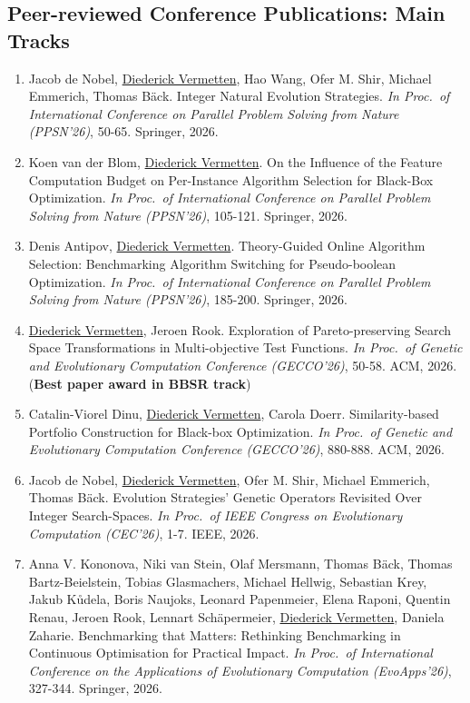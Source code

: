 \subsection*{Peer-reviewed Conference Publications: Main Tracks}
\begin{enumerate}

    \item Jacob de Nobel, \underline{Diederick Vermetten}, Hao Wang, Ofer M. Shir, Michael Emmerich, Thomas B\"ack. Integer Natural Evolution Strategies.
    \emph{In Proc.~of International Conference on Parallel Problem Solving from Nature (PPSN'26)}, 50-65. Springer, 2026.

    \item Koen van der Blom, \underline{Diederick Vermetten}. On the Influence of the Feature Computation Budget on Per-Instance Algorithm Selection for Black-Box Optimization.
    \emph{In Proc.~of International Conference on Parallel Problem Solving from Nature (PPSN'26)}, 105-121. Springer, 2026.

    \item Denis Antipov, \underline{Diederick Vermetten}. Theory-Guided Online Algorithm Selection: Benchmarking Algorithm Switching for Pseudo-boolean Optimization.
    \emph{In Proc.~of International Conference on Parallel Problem Solving from Nature (PPSN'26)}, 185-200. Springer, 2026.

    \item \underline{Diederick Vermetten}, Jeroen Rook. Exploration of Pareto-preserving Search Space Transformations in Multi-objective Test Functions.
    \emph{In Proc.~of Genetic and Evolutionary Computation Conference (GECCO'26)}, 50-58. ACM, 2026. (\textbf{Best paper award in BBSR track})

    \item Catalin-Viorel Dinu, \underline{Diederick Vermetten}, Carola Doerr. Similarity-based Portfolio Construction for Black-box Optimization.
    \emph{In Proc.~of Genetic and Evolutionary Computation Conference (GECCO'26)}, 880-888. ACM, 2026.

    \item Jacob de Nobel, \underline{Diederick Vermetten}, Ofer M. Shir, Michael Emmerich, Thomas B\"ack. Evolution Strategies' Genetic Operators Revisited Over Integer Search-Spaces.
    \emph{In Proc.~of IEEE Congress on Evolutionary Computation (CEC'26)}, 1-7. IEEE, 2026.

    \item Anna V. Kononova, Niki van Stein, Olaf Mersmann, Thomas B\"ack, Thomas Bartz-Beielstein, Tobias Glasmachers, Michael Hellwig, Sebastian Krey, Jakub K\r{u}dela, Boris Naujoks, Leonard Papenmeier, Elena Raponi, Quentin Renau, Jeroen Rook, Lennart Sch\"apermeier, \underline{Diederick Vermetten}, Daniela Zaharie. Benchmarking that Matters: Rethinking Benchmarking in Continuous Optimisation for Practical Impact.
    \emph{In Proc.~of International Conference on the Applications of Evolutionary Computation (EvoApps'26)}, 327-344. Springer, 2026.


\end{enumerate}
